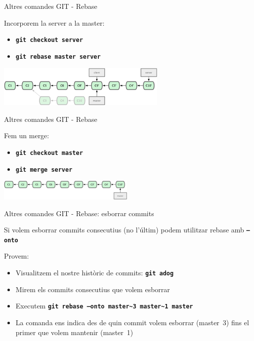 \documentclass[10pt,xcolor={rgb}]{beamer}
\begin{document}
    \begin{frame}[fragile]{Altres comandes GIT - Rebase}

      \begin{block}{Incorporem la server a la master:}
      \begin{itemize}
        \item \texttt{\textbf{git checkout server}}
        \item \texttt{\textbf{git rebase master server}}
      \end{itemize}

      \centering
      \includegraphics[height=2cm]{rebase7.png}

      \end{block}
    \end{frame}

    \begin{frame}[fragile]{Altres comandes GIT - Rebase}

      \begin{block}{Fem un merge:}
      \begin{itemize}
        \item \texttt{\textbf{git checkout master}}
        \item \texttt{\textbf{git merge server}}
      \end{itemize}

      \centering
      \includegraphics[height=1cm]{rebase8.png}

      \end{block}
    \end{frame}

    \begin{frame}[fragile]{Altres comandes GIT - Rebase: esborrar commits}

      Si volem esborrar commits consecutius (no l'últim) podem utilitzar rebase amb \texttt{\textbf{--onto}}
      \begin{block}{Provem:}
      \begin{itemize}
        \item Visualitzem el nostre històric de commits: \texttt{\textbf{git adog}}
        \item Mirem els commits consecutius que volem esborrar
        \item Executem \texttt{\textbf{git rebase --onto master\textasciitilde{}3 master\textasciitilde{}1 master}}
        \item La comanda ens indica des de quin commit volem esborrar (master~3) fins el primer que volem mantenir (master~1)
      \end{itemize}
      \end{block}
    \end{frame}
\end{document}
